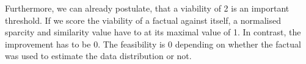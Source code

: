 \documentclass[./../../paper.tex]{subfiles}
\begin{document}
Furthermore, we can already postulate, that a viability of 2 is an important threshold. If we score the viability of a factual against itself, a normalised sparcity and similarity value have to at its maximal value of 1. In contrast, the improvement has to be 0. The feasibility is 0 depending on whether the factual was used to estimate the data distribution or not.  
\end{document}
